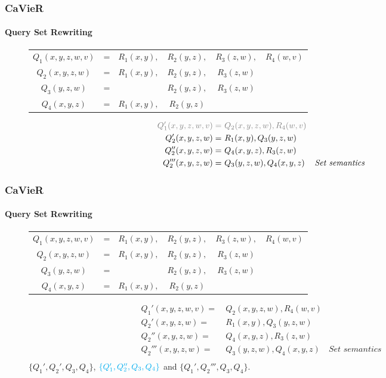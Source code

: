 \documentclass[
	11pt, %
]{beamer}
\begin{document}
\begin{frame}
	\frametitle{CaVieR}
	\framesubtitle{Query Set Rewriting}
	\begin{figure}
		\begin{tabular}{cccccc}
			$Q_1(x,y,z,w,v)$ &=& $R_1(x,y),$&$R_2(y,z),$& $R_3(z,w), $&$R_4(w,v)$\\
			\color{red}$Q_2(x,y,z,w)$ &\color{red}=& \color{red}$R_1(x,y),$&\color{red}$R_2(y,z),$&\color{red}$R_3(z,w)$&\\
			$Q_3(y,z,w)$ &=&& $R_2(y,z),$&$ R_3(z,w)$&\\
			$Q_4(x,y,z)$ &=& $R_1(x,y),$&$ R_2(y,z)$&&\\
		\end{tabular}
		\begin{align*}
			\color{gray}Q_1'(x,y,z,w,v) =&\color{gray}\ Q_2(x,y,z,w), R_4(w,v)&\\
			Q_2'(x,y,z,w) =&\ R_1(x,y), Q_3(y,z,w) &\\
			Q_2''(x,y,z,w) =&\ Q_4(x,y,z), R_3(z,w)&\\
			Q_2'''(x,y,z,w) =&\ Q_3(y,z,w), Q_4(x,y,z)& \textit{Set semantics}\\
		\end{align*}
	\end{figure}
\end{frame}


\begin{frame}
	\frametitle{CaVieR}
	\framesubtitle{Query Set Rewriting}
	\begin{figure}
		\begin{tabular}{cccccc}
			$Q_1(x,y,z,w,v)$ &=& $R_1(x,y),$&$R_2(y,z),$& $R_3(z,w), $&$R_4(w,v)$\\
			$Q_2(x,y,z,w)$ &=& $R_1(x,y),$&$R_2(y,z),$&$R_3(z,w)$&\\
			$Q_3(y,z,w)$ &=&& $R_2(y,z),$&$ R_3(z,w)$&\\
			$Q_4(x,y,z)$ &=& $R_1(x,y),$&$ R_2(y,z)$&&\\
		\end{tabular}
		\begin{align*}
			Q_1'(x,y,z,w,v) =&\ Q_2(x,y,z,w), R_4(w,v)&\\
			Q_2'(x,y,z,w) =&\ R_1(x,y), Q_3(y,z,w) &\\
			Q_2''(x,y,z,w) =&\ Q_4(x,y,z), R_3(z,w)&\\
			Q_2'''(x,y,z,w) =&\ Q_3(y,z,w), Q_4(x,y,z)& \textit{Set semantics}\\
		\end{align*}
		$\{Q_1', Q_2', Q_3, Q_4\}$, $\color{cyan}\{Q_1', Q_2'', Q_3, Q_4\}$ and $\{Q_1', Q_2''', Q_3, Q_4\}$.
	\end{figure}
\end{frame}
\end{document}
